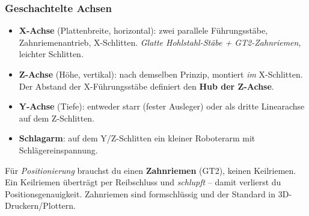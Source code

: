 \subsubsection{Geschachtelte Achsen}
\begin{itemize}
\item \textbf{X-Achse} (Plattenbreite, horizontal): zwei parallele
  Führungsstäbe, Zahnriemenantrieb, X-Schlitten. \emph{Glatte Hohlstahl-Stäbe +
  GT2-Zahnriemen}, leichter Schlitten.
\item \textbf{Z-Achse} (Höhe, vertikal): nach demselben Prinzip, montiert
  \emph{im} X-Schlitten. Der Abstand der X-Führungsstäbe definiert den
  \textbf{Hub der Z-Achse}.
\item \textbf{Y-Achse} (Tiefe): entweder starr (fester Ausleger) oder als
  dritte Linearachse auf dem Z-Schlitten.
\item \textbf{Schlagarm}: auf dem Y/Z-Schlitten ein kleiner Roboterarm mit
  Schlägereinspannung.
\end{itemize}
\begin{warnbox}[title={Zahnriemen, nicht Keilriemen}]
Für \emph{Positionierung} brauchst du einen \textbf{Zahnriemen} (GT2),
keinen Keilriemen. Ein Keilriemen überträgt per Reibschluss und \emph{schlupft}
-- damit verlierst du Positionsgenauigkeit. Zahnriemen sind formschlüssig und
der Standard in 3D-Druckern/Plottern.
\end{warnbox}


